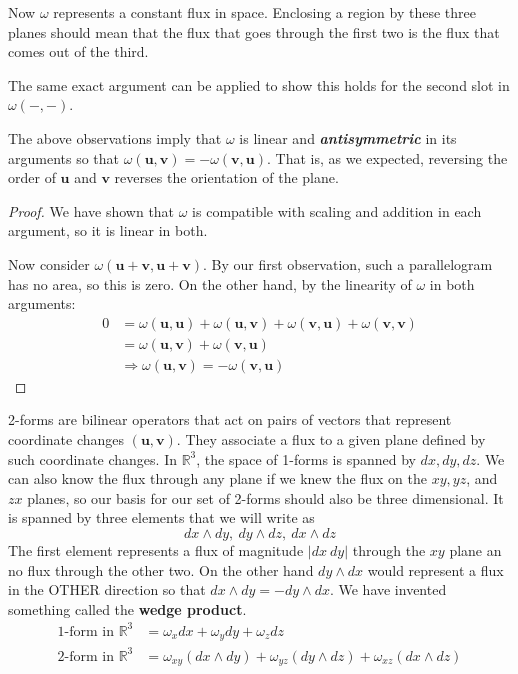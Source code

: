	Now $\omega$ represents a constant flux in space. Enclosing a region by these three planes should mean that the flux that goes through the first two is the flux that comes out of the third.
	
	The same exact argument can be applied to show this holds for the second slot in $\omega(-,-)$.
	\begin{cor}
		The above observations imply that $\omega$ is linear and \emph{\textbf{antisymmetric}} in its arguments so that $\omega(\mathbf u, \mathbf v) = -\omega(\mathbf v, \mathbf u)$. That is, as we expected, reversing the order of $\mathbf u$ and $\mathbf v$ reverses the orientation of the plane.
	\end{cor}
	\begin{proof}
		We have shown that $\omega$ is compatible with scaling and addition in each argument, so it is linear in both.
		
		Now consider $\omega(\mathbf u + \mathbf v, \mathbf u + \mathbf v)$. By our first observation, such a parallelogram has no area, so this is zero. On the other hand, by the linearity of $\omega$ in both arguments:
		\begin{align*}
			0 &= \omega(\mathbf u, \mathbf u) + \omega(\mathbf u, \mathbf v) + \omega(\mathbf v, \mathbf u) + \omega( \mathbf v , \mathbf v) 
			\\
			&= \omega(\mathbf u, \mathbf v) + \omega( \mathbf v, \mathbf u) \\
			&\Rightarrow \omega(\mathbf u, \mathbf v) = - \omega(\mathbf v, \mathbf u)
		\end{align*}
	\end{proof}
	
	2-forms are bilinear operators that act on pairs of vectors that represent coordinate changes $(\mathbf u, \mathbf v)$. They associate a flux to a given plane defined by such coordinate changes. 
	In $\mathbb{R}^3$, the space of 1-forms is spanned by $dx, dy, dz$. We can also know the flux through any plane if we knew the flux on the $xy, yz$, and $zx$ planes, so our basis for our set of 2-forms should also be three dimensional. It is spanned by three elements that we will write as
	\begin{equation*}
		dx \wedge dy, ~ dy \wedge dz, ~ dx \wedge dz
	\end{equation*}
	The first element represents a flux of magnitude $|dx ~ dy|$ through the $xy$ plane an no flux through the other two. On the other hand $dy \wedge dx$ would represent a flux in the OTHER direction so that $dx \wedge dy = - dy \wedge dx$. We have invented something called the \textbf{wedge product}.
	\begin{align*}
		\text{1-form in $\mathbb R^3$} &= \omega_x dx + \omega_y dy + \omega_z dz\\
		\text{2-form in $\mathbb R^3$} 
		&=
		\omega_{xy} (dx \wedge dy) + \omega_{yz} (dy \wedge dz) + \omega_{xz} (dx \wedge dz) 
	\end{align*}
	
